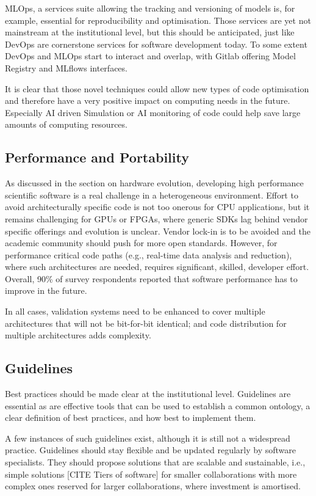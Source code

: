 MLOps, a services suite allowing the tracking and versioning of models is, for example, essential for reproducibility and optimisation. Those services are yet not mainstream at the institutional level, but this should be anticipated, just like DevOps are cornerstone services for software development today. To some extent DevOps and MLOps start to interact and overlap, with Gitlab offering Model Registry and MLflows interfaces.

It is clear that those novel techniques could allow new types of code optimisation and therefore have a very positive impact on computing needs in the future. Especially AI driven Simulation or AI monitoring of code could help save large amounts of computing resources.


\subsection{Performance and Portability}

As discussed in the section on hardware evolution, developing high performance scientific software is a real challenge in a heterogeneous environment. Effort to avoid architecturally specific code is not too onerous for CPU applications, but it remains challenging for GPUs or FPGAs, where generic SDKs lag behind vendor specific offerings and evolution is unclear. Vendor lock-in is to be avoided and the academic community should push for more open standards. However, for performance critical code paths (e.g., real-time data analysis and reduction), where such architectures are needed, requires significant, skilled, developer effort. Overall, 90\% of survey respondents reported that software performance has to improve in the future.

In all cases, validation systems need to be enhanced to cover multiple architectures that will not be bit-for-bit identical; and code distribution for multiple architectures adds complexity.

\subsection{Guidelines}

Best practices should be made clear at the institutional level. Guidelines are essential as are effective tools that can be used to establish a common ontology, a clear definition of best practices, and how best to implement them. 

A few instances of such guidelines exist, although it is still not a widespread practice. Guidelines should stay flexible and be updated regularly by software specialists. They should propose solutions that are scalable and sustainable, i.e., simple solutions [CITE Tiers of software] for smaller collaborations with more complex ones reserved for larger collaborations, where investment is amortised.

